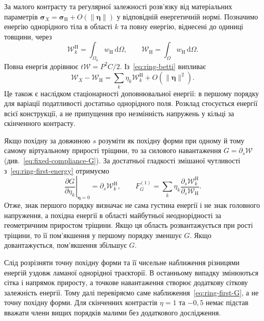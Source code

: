 За малого контрасту та регулярної залежності розв'язку від матеріальних параметрів $\boldsymbol\sigma_X=\boldsymbol\sigma_{\mathrm H}+O(\|\boldsymbol\eta\|)$ у відповідній енергетичній нормі. Позначимо енергію однорідного тіла в області $k$ та повну енергію, віднесені до одиниці товщини, через
\begin{equation}
 \mathcal W_k^{\mathrm H}=\int_{\Omega_k} w_{\mathrm H}\,\mathrm d\Omega,
 \qquad \mathcal W_{\mathrm H}=\int_\Omega w_{\mathrm H}\,\mathrm d\Omega .
 \label{eq:ring-energies}
\end{equation}
Повна енергія дорівнює $t\mathcal W=P^2 C/2$. Із~\eqref{eq:ring-betti} випливає
\begin{equation}
 \mathcal W_X-\mathcal W_{\mathrm H}
 =\sum_k\eta_k\mathcal W_k^{\mathrm H}
 +O(\|\boldsymbol\eta\|^2).
 \label{eq:ring-first-energy}
\end{equation}
Це також є наслідком стаціонарності доповнювальної енергії: в першому порядку для варіації податливості достатньо однорідного поля. Розклад стосується енергії всієї конструкції, а не припущення про незмінність напружень у кільці за скінченного контрасту.

Якщо похідну за довжиною $s$ розуміти як похідну форми при одному й тому самому віртуальному прирості тріщини, то за силового навантаження $G=\partial_s\mathcal W$ (див.~\eqref{eq:fixed-compliance-G}). За достатньої гладкості змішаної чутливості з~\eqref{eq:ring-first-energy} отримуємо
\begin{equation}
 \left.\frac{\partial G}{\partial\eta_k}\right|_{\boldsymbol\eta=0}
 =\partial_s\mathcal W_k^{\mathrm H},
 \qquad
 F_G^{(1)}=\sum_k\eta_k
 \frac{\partial_s\mathcal W_k^{\mathrm H}}{\partial_s\mathcal W_{\mathrm H}}.
 \label{eq:ring-first-G}
\end{equation}
Отже, знак першого порядку визначає не сама густина енергії і не знак головного напруження, а похідна енергії в області майбутньої неоднорідності за геометричним приростом тріщини. Якщо ця область розвантажується при рості тріщини, то її пом'якшення у першому порядку зменшує $G$. Якщо довантажується, пом'якшення збільшує $G$.

Слід розрізняти точну похідну форми та її чисельне наближення різницями енергій уздовж ламаної однорідної траєкторії. В останньому випадку змінюються сітка і напрямок приросту, а точкове навантаження створює додаткову сіткову залежність енергії. Тому далі перевіряємо саме наближення~\eqref{eq:ring-first-G}, а не точну похідну форми. Для скінченних контрастів $\eta=1$ та $-0{,}5$ немає підстав вважати члени вищих порядків малими без додаткового дослідження.

